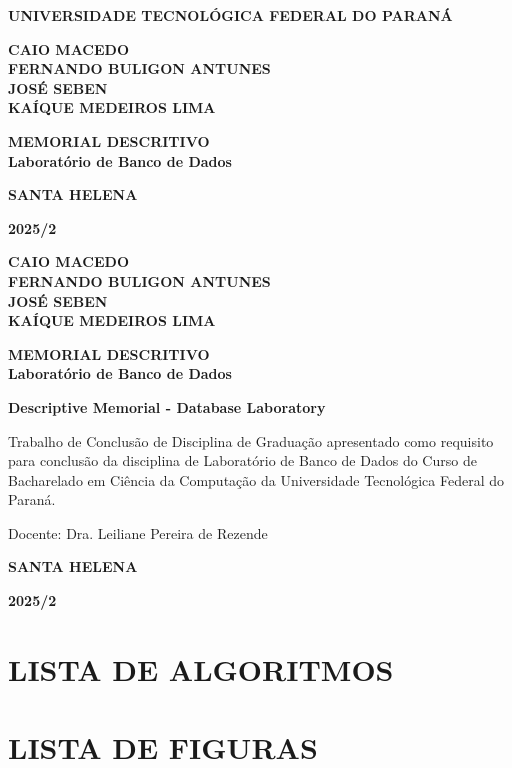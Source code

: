 \documentclass[
12pt,
a4paper,
semrecuonosumario,
sumario = abnt-6027-2012]{report}
\newcommand{\universidade}{UNIVERSIDADE TECNOLÓGICA FEDERAL DO PARANÁ}
\newcommand{\autores}{CAIO MACEDO\\ FERNANDO BULIGON ANTUNES\\ JOSÉ SEBEN\\ KAÍQUE MEDEIROS LIMA}
\newcommand{\titulo}{MEMORIAL DESCRITIVO\\Laboratório de Banco de Dados}
\newcommand{\english}{Descriptive Memorial - Database Laboratory}
\newcommand{\cidade}{SANTA HELENA}
\newcommand{\periodo}{2025/2}
\begin{document}
\begin{titlepage}
    \centering
    {\bf \universidade\par}
    \vspace{4cm}
    {\bf\autores\par}
    \vspace{6cm}
    {\bf\titulo\par}
    \vspace{9cm}
    {\bf\cidade\par}
    {\bf\periodo\par}
    \newpage

    {\bf\autores\par}
    \vspace{3.5cm}
    {\bf\titulo\par}
    \vspace{2cm}
    {\bf\english\par}
    \vspace{3cm}
    \begin{flushright} %
        \begin{minipage}{0.5\textwidth} %
        \justifying %
        \noindent
        Trabalho de Conclusão de Disciplina de Graduação apresentado como requisito para conclusão da disciplina de Laboratório de Banco de Dados do Curso de Bacharelado em Ciência da Computação da Universidade Tecnológica Federal do Paraná.

        \vspace{1em}
        \noindent
        Docente: Dra. Leiliane Pereira de Rezende
        \end{minipage}
    \end{flushright}
    \vspace{5cm}
    {\bf\cidade\par}
    {\bf\periodo\par}
    \thispagestyle{empty}
\end{titlepage}
\newpage
\setcounter{page}{1}
\section*{\centering \small\bfseries LISTA DE ALGORITMOS}

\newpage
\section*{\centering \small\bfseries LISTA DE FIGURAS}
\end{document}
